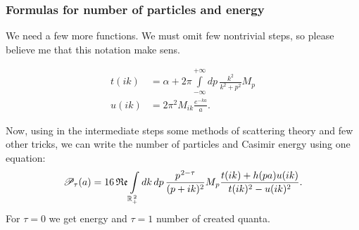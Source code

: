 \documentclass[10pt,t]{beamer}
\begin{document}
\begin{frame}
  \frametitle{Formulas for number of particles and energy}


  We need a few more functions. We must omit few nontrivial
  steps, so please believe me that this notation make sens.

  \vspace{-2em}



  \begin{subequations}

    \begin{align}
      \label{eq:Scalar-field-and-two-quasi-deltas-08-A}
      t( i k )
      &=
        \alpha + 2\pi \int\limits_{ -\infty }^{ +\infty } dp \,
        \frac{ k^{ 2 } }{ k^{ 2 } + p^{ 2 } } M_{ p } \\
      \label{eq:Scalar-field-and-two-quasi-deltas-08-B}
      u( i k )
      &=
        2\pi^{ 2 } M_{ i k } \frac{ e^{ -ka } }{ a }.
    \end{align}

  \end{subequations}

  \vspace{-1em}



  Now, using in the intermediate steps some methods of scattering theory
  and few other tricks, we can write the number of particles and Casimir
  energy using one equation:
  \begin{equation}
    \label{eq:Scalar-field-and-two-quasi-deltas-09}
    \mathcal{P}_{ \tau }( a ) =
    16 \operatorname{\mathfrak{Re}} \int\limits_{ \mathbb{R}_{ + }^{ \, 2 } } dk \, dp \,
    \frac{ p^{ \hspace{0.05em} 2 - \tau } }{ ( p + i k )^{ 2 } } M_{ \hspace{0.05em} p }
    \frac{ t( i k ) + h( p a ) u( i k ) }{ t( i k )^{ 2 } - u( i k )^{ 2 } }.
  \end{equation}
  For $\tau = 0$ we get energy and $\tau = 1$ number of created quanta.

\end{frame}
\end{document}
